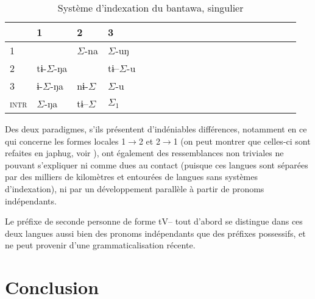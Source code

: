 \documentclass[oldfontcommands,oneside,a4paper,11pt]{article}
\newcommand{\ipa}[1]{{\phon \mbox{#1}}} %
\newcommand{\grise}[1]{\cellcolor{lightgray}\textbf{#1}}
\newcommand{\ra}{$\Sigma_1$}
\newcommand{\ro}{$\Sigma$}
\begin{document}
\begin{table}
\caption{Système d'indexation du bantawa, singulier} \centering \label{tab:bantawa}
\begin{tabular}{l|lllllllllllllllllll}
\toprule
&1 & 2 &3 &\\
\midrule
1 &\grise{}& \ro{}-\ipa{na} & \ro{}-\ipa{uŋ}	 \\
2 &\ipa{tɨ-}\ro{}-\ipa{ŋa} &\grise{} &\ipa{tɨ--}\ro{}-\ipa{u}\\
3 &\ipa{ɨ-}\ro{}-\ipa{ŋa}&\ipa{nɨ-}\ro{}& \ro{}-\ipa{u}\\
\midrule
\textsc{intr} & \ro{}-\ipa{ŋa}&\ipa{tɨ--}\ro{}&\ra{} \\
\bottomrule
\end{tabular}
\end{table}

Des deux paradigmes, s'ils présentent d'indéniables différences, notamment en ce qui concerne les formes locales 1$\rightarrow$2 et 2$\rightarrow$1 (on peut montrer que celles-ci sont refaites en japhug, voir \citealt{jacques15generic}), ont également des ressemblances non triviales ne pouvant s'expliquer ni comme dues au contact (puisque ces langues sont séparées par des milliers de kilomètres et entourées de langues sans systèmes d'indexation), ni par un développement parallèle à partir de pronoms indépendants.

Le préfixe de seconde personne de forme \ipa{tV--} tout d'abord se distingue dans ces deux langues aussi bien des pronoms indépendants que des préfixes possessifs, et ne peut provenir d'une grammaticalisation récente.

\section{Conclusion}
  


\end{document}
